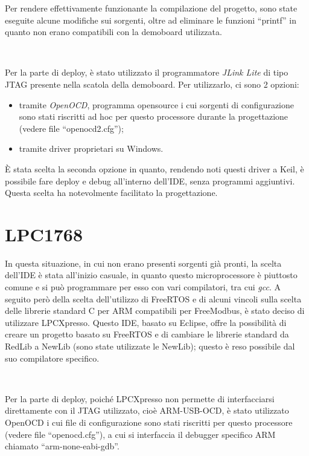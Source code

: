 \documentclass[a4paper,titlepage]{book}
\newcommand{\itema}{\begin{itemize}[noitemsep,topsep=10pt,parsep=5pt,partopsep=10pt]}
\begin{document}
Per rendere effettivamente funzionante la compilazione del progetto, sono state eseguite alcune modifiche sui sorgenti, oltre ad eliminare le funzioni ``printf'' in quanto non erano compatibili con la demoboard utilizzata.

~

Per la parte di deploy, è stato utilizzato il programmatore \textit{JLink Lite} di tipo JTAG presente nella scatola della demoboard. Per utilizzarlo, ci sono 2 opzioni:

\itema

\item tramite \textit{OpenOCD}, programma opensource i cui sorgenti di configurazione sono stati riscritti ad hoc per questo processore durante la progettazione (vedere file ``openocd2.cfg'');

\item tramite driver proprietari su Windows.

\end{itemize}

È stata scelta la seconda opzione in quanto, rendendo noti questi driver a Keil, è possibile fare deploy e debug all'interno dell'IDE, senza programmi aggiuntivi. Questa scelta ha notevolmente facilitato la progettazione.

\section{LPC1768}

In questa situazione, in cui non erano presenti sorgenti già pronti, la scelta dell'IDE è stata all'inizio casuale, in quanto questo microprocessore è piuttosto comune e si può programmare per esso con vari compilatori, tra cui \textit{gcc}. A seguito però della scelta dell'utilizzo di FreeRTOS e di alcuni vincoli sulla scelta delle librerie standard C per ARM compatibili per FreeModbus, è stato deciso di utilizzare LPCXpresso. Questo IDE, basato su Eclipse, offre la possibilità di creare un progetto basato su FreeRTOS e di cambiare le librerie standard da RedLib a NewLib (sono state utilizzate le NewLib); questo è reso possibile dal suo compilatore specifico.

~

Per la parte di deploy, poiché LPCXpresso non permette di interfacciarsi direttamente con il JTAG utilizzato, cioè ARM-USB-OCD, è stato utilizzato OpenOCD i cui file di configurazione sono stati riscritti per questo processore (vedere file ``openocd.cfg''), a cui si interfaccia il debugger specifico ARM chiamato ``arm-none-eabi-gdb''.
\end{document}

